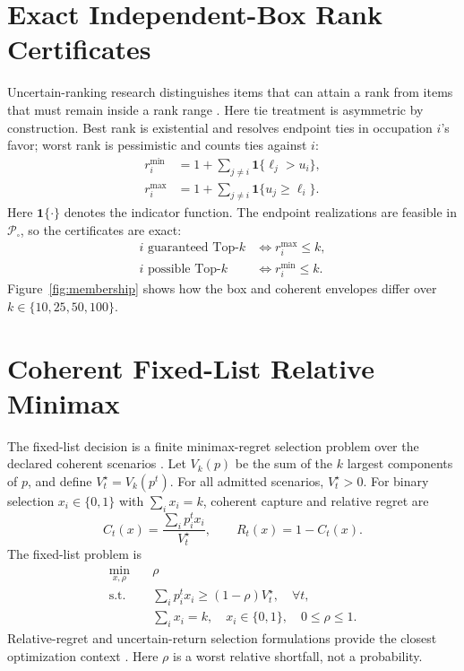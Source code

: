 \documentclass[conference]{IEEEtran}
\newcommand{\ind}{\mathbf{1}}
\begin{document}
\section{Exact Independent-Box Rank Certificates}
Uncertain-ranking research distinguishes items that can attain a rank from items that must remain inside a rank range \cite{soliman2009,mouratidis2015,mouratidis2018}. Here tie treatment is asymmetric by construction. Best rank is existential and resolves endpoint ties in occupation $i$'s favor; worst rank is pessimistic and counts ties against $i$:
\begin{align}
r_i^{\min}&=1+\sum_{j\ne i}\ind\{\ell_j>u_i\},\\
r_i^{\max}&=1+\sum_{j\ne i}\ind\{u_j\ge\ell_i\}.
\label{eq:ranks}
\end{align}
Here $\ind\{\cdot\}$ denotes the indicator function. The endpoint realizations are feasible in $\mathcal P_{\square}$, so the certificates are exact:
\begin{align}
i\text{ guaranteed Top-}k&\iff r_i^{\max}\le k,\\
i\text{ possible Top-}k&\iff r_i^{\min}\le k.
\end{align}
Figure~\ref{fig:membership} shows how the box and coherent envelopes differ over $k\in\{10,25,50,100\}$.

\section{Coherent Fixed-List Relative Minimax}
The fixed-list decision is a finite minimax-regret selection problem over the declared coherent scenarios \cite{bertsimas2003,bertsimas2004,bertsimas2011,aissi2009,ide2016,roy2010}. Let $V_k(p)$ be the sum of the $k$ largest components of $p$, and define $V_t^\star=V_k(p^t)$. For all admitted scenarios, $V_t^\star>0$. For binary selection $x_i\in\{0,1\}$ with $\sum_i x_i=k$, coherent capture and relative regret are
\begin{equation}
C_t(x)=\frac{\sum_i p_i^t x_i}{V_t^\star},\qquad R_t(x)=1-C_t(x).
\end{equation}
The fixed-list problem is
\begin{align}
\min_{x,\rho}\quad &\rho\\
\text{s.t.}\quad &\sum_i p_i^t x_i\ge(1-\rho)V_t^\star,\quad \forall t,\\
&\sum_i x_i=k,\quad x_i\in\{0,1\},\quad 0\le\rho\le1.
\label{eq:minimax}
\end{align}
Relative-regret and uncertain-return selection formulations provide the closest optimization context \cite{averbakh2005,kouvelis1997,savage1951,conde2004,kasperski2008}. Here $\rho$ is a worst relative shortfall, not a probability.
\end{document}
